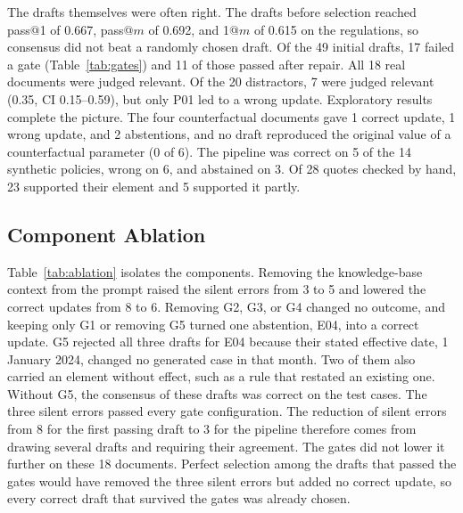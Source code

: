 The drafts themselves were often right. The drafts before selection reached pass@1 of 0.667, pass@$m$ of 0.692, and 1@$m$ of 0.615 on the regulations, so consensus did not beat a randomly chosen draft. Of the 49 initial drafts, 17 failed a gate (Table~\ref{tab:gates}) and 11 of those passed after repair. All 18 real documents were judged relevant. Of the 20 distractors, 7 were judged relevant (0.35, CI 0.15--0.59), but only P01 led to a wrong update. Exploratory results complete the picture. The four counterfactual documents gave 1 correct update, 1 wrong update, and 2 abstentions, and no draft reproduced the original value of a counterfactual parameter (0 of 6). The pipeline was correct on 5 of the 14 synthetic policies, wrong on 6, and abstained on 3. Of 28 quotes checked by hand, 23 supported their element and 5 supported it partly.

\subsection{Component Ablation}
\label{sec:res-ablation}
Table~\ref{tab:ablation} isolates the components. Removing the knowledge-base context from the prompt raised the silent errors from 3 to 5 and lowered the correct updates from 8 to 6. Removing G2, G3, or G4 changed no outcome, and keeping only G1 or removing G5 turned one abstention, E04, into a correct update. G5 rejected all three drafts for E04 because their stated effective date, 1 January 2024, changed no generated case in that month. Two of them also carried an element without effect, such as a rule that restated an existing one. Without G5, the consensus of these drafts was correct on the test cases. The three silent errors passed every gate configuration. The reduction of silent errors from 8 for the first passing draft to 3 for the pipeline therefore comes from drawing several drafts and requiring their agreement. The gates did not lower it further on these 18 documents. Perfect selection among the drafts that passed the gates would have removed the three silent errors but added no correct update, so every correct draft that survived the gates was already chosen.

